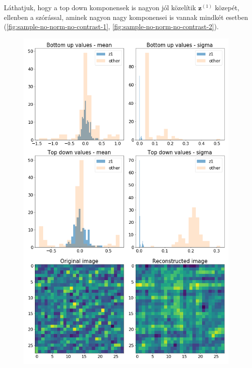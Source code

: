 \documentclass[12pt, english]{article}
\begin{document}
\vspace{4mm}

\par Láthatjuk, hogy a top down komponensek is nagyon jól közelítik $\bm{z}^{(1)}$ közepét, ellenben a szórással, aminek nagyon nagy komponensei is vannak mindkét esetben (\ref{fig:sample-no-norm-no-contrast-1}, \ref{fig:sample-no-norm-no-contrast-2}).

\vspace{4mm}

\begin{figure}[H]
  \begin{minipage}{0.5\linewidth}
    \centering
    \includegraphics[width=.6\linewidth]{z1_vis/z1_vis_no_contrast_norm/17_DenseLinLinLadderVAE_contrastNorm-stats-1_TD_BU_COMPS_1.png}
  \end{minipage}
  \begin{minipage}{0.5\linewidth}
    \centering

\end{minipage}
\end{figure}
\end{document}
